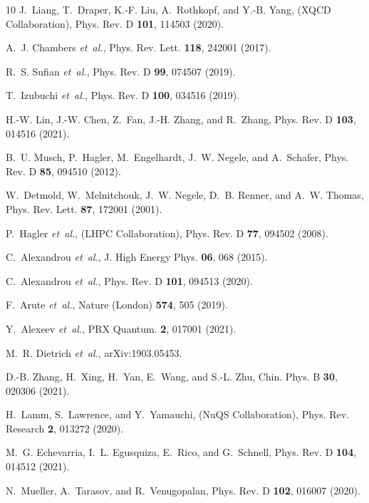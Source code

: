 \documentclass[aps,prl,twocolumn,superscriptaddress,notitlepage,nofootinbib]{revtex4-1}
\begin{document}
\begin{thebibliography}{10}
J.~Liang, T.~Draper, K.-F. Liu, A.~Rothkopf, and Y.-B. Yang, (XQCD
  Collaboration),
\newblock Phys. Rev. D {\bf 101}, 114503 (2020).

A.~J. Chambers {\em et~al.},
\newblock Phys. Rev. Lett. {\bf 118}, 242001 (2017).

R.~S. Sufian {\em et~al.},
\newblock Phys. Rev. D {\bf 99}, 074507 (2019).

T.~Izubuchi {\em et~al.},
\newblock Phys. Rev. D {\bf 100}, 034516 (2019).

H.-W. Lin, J.-W. Chen, Z.~Fan, J.-H. Zhang, and R.~Zhang,
\newblock Phys. Rev. D {\bf 103}, 014516 (2021).

B.~U. Musch, P.~Hagler, M.~Engelhardt, J.~W. Negele, and A.~Schafer,
\newblock Phys. Rev. D {\bf 85}, 094510 (2012).

W.~Detmold, W.~Melnitchouk, J.~W. Negele, D.~B. Renner, and A.~W. Thomas,
\newblock Phys. Rev. Lett. {\bf 87}, 172001 (2001).

P.~Hagler {\em et~al.}, (LHPC Collaboration),
\newblock Phys. Rev. D {\bf 77}, 094502 (2008).

C.~Alexandrou {\em et~al.},
\newblock J. High Energy Phys. {\bf 06}, 068 (2015).

C.~Alexandrou {\em et~al.},
\newblock Phys. Rev. D {\bf 101}, 094513 (2020).

F.~Arute {\em et~al.},
\newblock Nature (London) {\bf 574}, 505 (2019).

Y.~Alexeev {\em et~al.},
\newblock PRX Quantum. {\bf 2}, 017001 (2021).

M.~R. Dietrich {\em et~al.},
\newblock arXiv:1903.05453.

D.-B. Zhang, H.~Xing, H.~Yan, E.~Wang, and S.-L. Zhu,
\newblock Chin. Phys. B {\bf 30}, 020306 (2021).

H.~Lamm, S.~Lawrence, and Y.~Yamauchi, (NuQS Collaboration),
\newblock Phys. Rev. Research {\bf 2}, 013272 (2020).

M.~G. Echevarria, I.~L. Egusquiza, E.~Rico, and G.~Schnell,
\newblock Phys. Rev. D {\bf 104}, 014512 (2021).

N.~Mueller, A.~Tarasov, and R.~Venugopalan,
\newblock Phys. Rev. D {\bf 102}, 016007 (2020).


\end{thebibliography}
\end{document}
